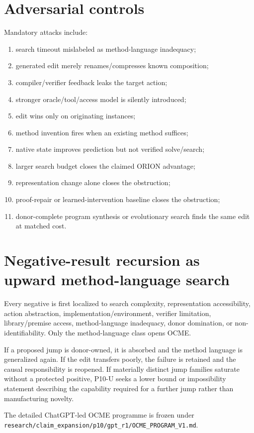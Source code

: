 \documentclass[11pt]{article}
\begin{document}
\section{Adversarial controls}
Mandatory attacks include:
\begin{enumerate}
    \item search timeout mislabeled as method-language inadequacy;
    \item generated edit merely renames/compresses known composition;
    \item compiler/verifier feedback leaks the target action;
    \item stronger oracle/tool/access model is silently introduced;
    \item edit wins only on originating instances;
    \item method invention fires when an existing method suffices;
    \item native state improves prediction but not verified solve/search;
    \item larger search budget closes the claimed ORION advantage;
    \item representation change alone closes the obstruction;
    \item proof-repair or learned-intervention baseline closes the obstruction;
    \item donor-complete program synthesis or evolutionary search finds the same edit at matched cost.
\end{enumerate}

\section{Negative-result recursion as upward method-language search}
Every negative is first localized to search complexity, representation accessibility, action abstraction, implementation/environment, verifier limitation, library/premise access, method-language inadequacy, donor domination, or non-identifiability. Only the method-language class opens OCME.

If a proposed jump is donor-owned, it is absorbed and the method language is generalized again. If the edit transfers poorly, the failure is retained and the causal responsibility is reopened. If materially distinct jump families saturate without a protected positive, P10-U seeks a lower bound or impossibility statement describing the capability required for a further jump rather than manufacturing novelty.

The detailed ChatGPT-led OCME programme is frozen under \texttt{research/claim\_expansion/p10/gpt\_r1/OCME\_PROGRAM\_V1.md}.
\end{document}
